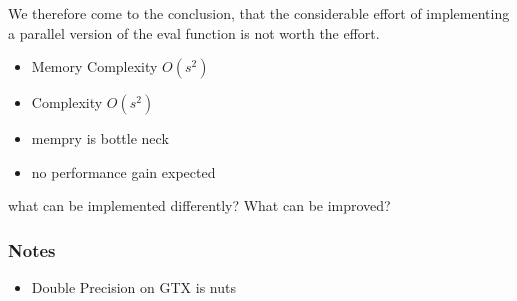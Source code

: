 We therefore come to the conclusion, that the considerable effort of implementing a parallel version of the eval function is not worth the effort.
\begin{itemize}
	\item Memory Complexity $O(s^2)$
	\item Complexity $O(s^2)$
	\item mempry is bottle neck
	\item no performance gain expected
\end{itemize}

what can be implemented differently? What can be improved?

\subsubsection{Notes}
\begin{itemize}
	\item Double Precision on GTX is nuts
\end{itemize}

